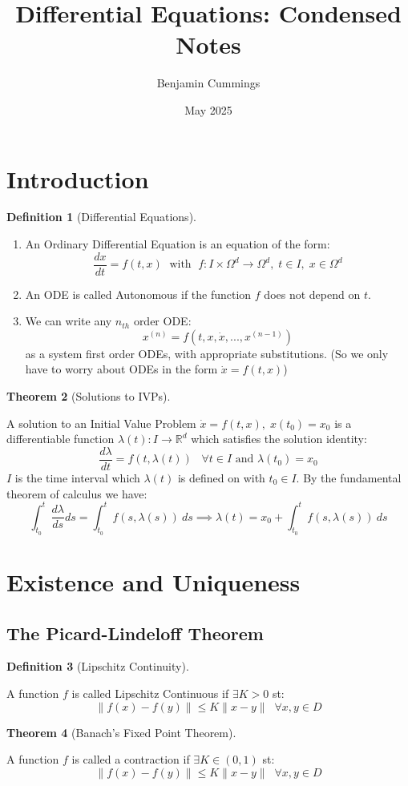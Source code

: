 \documentclass{article}
\title{Differential Equations: Condensed Notes}
\author{Benjamin Cummings}
\date{May 2025}
\newtheorem{thm}{Theorem}[section]
\newtheorem{defn}[thm]{Definition}
\begin{document}
\maketitle

\section{Introduction}
\begin{defn}[Differential Equations]
\end{defn}
\begin{enumerate}
    \item An Ordinary Differential Equation is an equation of the form:
    \[\frac{dx}{dt} = f(t, x) \;\text{ with }\; f:I\times\Omega^d \to \Omega^d,\; t \in I, \; x \in \Omega^d\]
    \item An ODE is called Autonomous if the function $f$ does not depend on $t$. 
    \item We can write any $n_{th}$ order ODE:
    \[x^{(n)} = f(t, x, \dot x , . . ., x^{(n-1)})\]
    as a system first order ODEs, with appropriate substitutions. (So we only have to worry about ODEs in the form $\dot x = f(t, x)$)
\end{enumerate}

\begin{thm}[Solutions to IVPs]
\end{thm}
A solution to an Initial Value Problem $\dot x = f(t, x), \; x(t_0) = x_0$ is a differentiable function $\lambda(t) : I \to \mathbb{R}^d$ which satisfies the solution identity:
\[\frac{d\lambda}{dt} = f(t, \lambda(t)) \;\;\;\forall t \in I \text{ and } \lambda(t_0) = x_0\]
$I$ is the time interval which $\lambda (t)$ is defined on with $t_0 \in I$.
By the fundamental theorem of calculus we have:
\[\int_{t_0}^t\frac{d\lambda}{ds}ds = \int_{t_0}^tf(s, \lambda (s)) \:ds \implies \lambda(t) = x_0 + \int_{t_0}^tf(s, \lambda (s)) \:ds\]

\newpage
\section{Existence and Uniqueness}

\subsection{The Picard-Lindeloff Theorem}

\begin{defn}[Lipschitz Continuity]\end{defn}
A function $f$ is called Lipschitz Continuous if $\exists K >0$ st:
\[\| f(x) - f(y)\| \leq K \| x - y\| \;\; \forall x,y \in D\]
\begin{thm}[Banach's Fixed Point Theorem]
\end{thm}
A function $f$ is called a contraction if $\exists K \in (0, 1)$ st:
\[\| f(x) - f(y)\| \leq K \| x - y\| \;\; \forall x,y \in D\]
\end{document}
